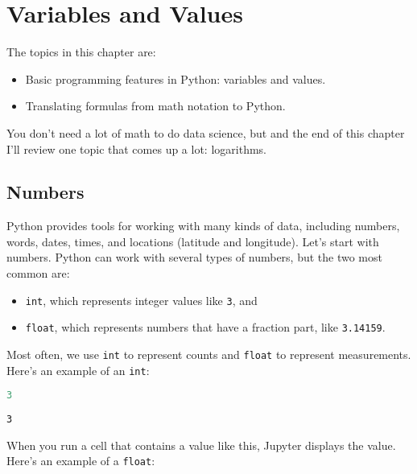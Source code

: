 \hypertarget{variables-and-values}{%
\chapter{Variables and Values}\label{variables-and-values}}

The topics in this chapter are:

\begin{itemize}
\item
  Basic programming features in Python: variables and values.
\item
  Translating formulas from math notation to Python.
\end{itemize}

You don't need a lot of math to do data science, but and the end of this
chapter I'll review one topic that comes up a lot: logarithms.

\hypertarget{numbers}{%
\section{Numbers}\label{numbers}}

Python provides tools for working with many kinds of data, including
numbers, words, dates, times, and locations (latitude and longitude).
Let's start with numbers. Python can work with several types of numbers,
but the two most common are:

\begin{itemize}
\item
  \passthrough{\lstinline!int!}, which represents integer values like
  \passthrough{\lstinline!3!}, and
\item
  \passthrough{\lstinline!float!}, which represents numbers that have a
  fraction part, like \passthrough{\lstinline!3.14159!}.
\end{itemize}

Most often, we use \passthrough{\lstinline!int!} to represent counts and
\passthrough{\lstinline!float!} to represent measurements. Here's an
example of an \passthrough{\lstinline!int!}:

\begin{lstlisting}[language=Python,style=source]
3
\end{lstlisting}

\begin{lstlisting}[style=output]
3
\end{lstlisting}

When you run a cell that contains a value like this, Jupyter displays
the value. Here's an example of a \passthrough{\lstinline!float!}:


